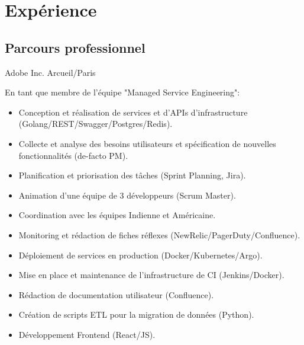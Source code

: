 \documentclass[10pt,a4paper,sans]{moderncv}        %
\begin{document}
\maketitle


\section{Expérience}
\subsection{Parcours professionnel}

        {Adobe Inc.}
        {Arcueil/Paris}
        {}
        {}

        {}
        {}
        {}
        {En tant que membre de l'équipe "Managed Service Engineering":
            \begin{itemize}
            \item Conception et réalisation de services et d'APIs d'infrastructure (Golang/REST/Swagger/Postgres/Redis).
            \item Collecte et analyse des besoins utilisateurs et spécification de nouvelles fonctionnalités (de-facto PM).
            \item Planification et priorisation des tâches (Sprint Planning, Jira).
            \item Animation d'une équipe de 3 développeurs (Scrum Master).
            \item Coordination avec les équipes Indienne et Américaine.
            \item Monitoring et rédaction de fiches réflexes (NewRelic/PagerDuty/Confluence).
            \item Déploiement de services en production (Docker/Kubernetes/Argo).
            \item Mise en place et maintenance de l'infrastructure de CI (Jenkins/Docker).
            \item Rédaction de documentation utilisateur (Confluence).
            \item Création de scripts ETL pour la migration de données (Python).
            \item Développement Frontend (React/JS).
            \end{itemize}
        }
\end{document}
